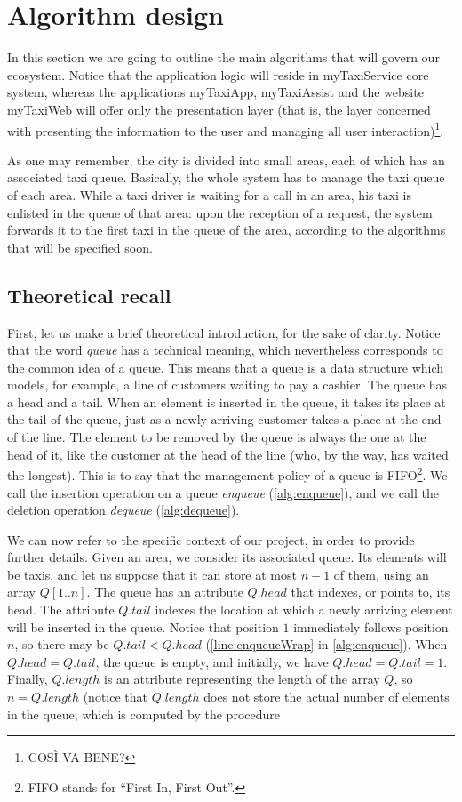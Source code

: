 \chapter{Algorithm design} \label{chap:algorithm}
In this section we are going to outline the main algorithms that will govern our ecosystem. Notice that the application logic will reside in myTaxiService core system, whereas the applications myTaxiApp, myTaxiAssist and the website myTaxiWeb will offer only the presentation layer (that is, the layer concerned with presenting the information to the user and managing all user interaction)\footnote{COS\`I VA BENE?}. %

As one may remember, the city is divided into small areas, each of which has an associated taxi queue. Basically, the whole system has to manage the taxi queue of each area. While a taxi driver is waiting for a call in an area, his taxi is enlisted in the queue of that area: upon the reception of a request, the system forwards it to the first taxi in the queue of the area, according to the algorithms that will be specified soon.


\section{Theoretical recall}
First, let us make a brief theoretical introduction, for the sake of clarity. Notice that the word \emph{queue} has a technical meaning, which nevertheless corresponds to the common idea of a queue. This means that a queue is a data structure which models, for example, a line of customers waiting to pay a cashier. The queue has a head and a tail. When an element is inserted in the queue, it takes its place at the tail of the queue, just as a newly arriving customer takes a place at the end of the line. The element to be removed by the queue is always the one at the head of it, like the customer at the head of the line (who, by the way, has waited the longest). This is to say that the management policy of a queue is FIFO\footnote{FIFO stands for ``First In, First Out''.}. We call the insertion operation on a queue \emph{enqueue} (\cref{alg:enqueue}), and we call the deletion operation \emph{dequeue} (\cref{alg:dequeue}). 

We can now refer to the specific context of our project, in order to provide further details. Given an area, we consider its associated queue. Its elements will be taxis, and let us suppose that it can store at most $n-1$ of them, using an array $Q\left[1..n\right]$. The queue has an attribute $Q.head$ that indexes, or points to, its head. The attribute $Q.tail$ indexes the location at which a newly arriving element will be inserted in the queue. Notice that position $1$ immediately follows position $n$, so there may be $Q.tail < Q.head$ (\cref{line:enqueueWrap} in \cref{alg:enqueue}). When $Q.head = Q.tail$, the queue is empty, and initially, we have $Q.head = Q.tail = 1$. Finally, $Q.length$ is an attribute representing the length of the array $Q$, so $n = Q.length$ (notice that $Q.length$ does not store the actual number of elements in the queue, which is computed by the procedure %


